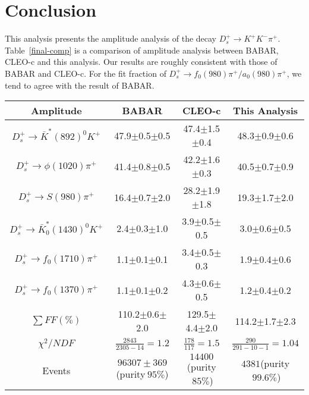 \documentclass[aps,prd,twocolumn,showpacs,amsmath,amssymb]{revtex4-1}
\begin{document}
\section{Conclusion}
\label{CONLUSION}
This analysis presents the amplitude analysis of the decay $D_{s}^{+} \rightarrow K^{+}K^{-}\pi^{+}$.
Table~\ref{final-comp} is a comparison of amplitude analysis between BABAR, CLEO-c and this analysis. Our results are roughly consistent with those of BABAR and CLEO-c.
For the fit fraction of $D_{s}^{+} \rightarrow f_{0}(980)\pi^{+}/a_{0}(980)\pi^{+}$, we tend to agree with the result of BABAR.
\begin{table*}[htbp]
    \caption{Comparison of fit fraction between BABAR, CLEO-c and this amplitude analysis.}
    \label{final-comp}
    \begin{center}
        \begin{tabular}{cccc}
            \hline\hline
            Amplitude & BABAR  & CLEO-c  & This Analysis\\
            \hline
            $D_{s}^{+} \rightarrow \bar{K}^{*}(892)^{0}K^{+}$              & 47.9$\pm$0.5$\pm$0.5  & 47.4$\pm$1.5$\pm$0.4& 48.3$\pm$0.9$\pm$0.6 \\
            $D_{s}^{+} \rightarrow \phi(1020)\pi^{+}$                      & 41.4$\pm$0.8$\pm$0.5  & 42.2$\pm$1.6$\pm$0.3& 40.5$\pm$0.7$\pm$0.9 \\
            $D_{s}^{+} \rightarrow S(980)\pi^{+}$    & 16.4$\pm$0.7$\pm$2.0  & 28.2$\pm$1.9$\pm$1.8& 19.3$\pm$1.7$\pm$2.0 \\
            $D_{s}^{+} \rightarrow \bar{K}^{*}_{0}(1430)^{0}K^{+}$         & 2.4$\pm$0.3$\pm$1.0   & 3.9$\pm$0.5$\pm$0.5 & 3.0$\pm$0.6$\pm$0.5  \\
            $D_{s}^{+} \rightarrow f_{0}(1710)\pi^{+}$                     & 1.1$\pm$0.1$\pm$0.1   & 3.4$\pm$0.5$\pm$0.3 & 1.9$\pm$0.4$\pm$0.6  \\
            $D_{s}^{+} \rightarrow f_{0}(1370)\pi^{+}$                     & 1.1$\pm$0.1$\pm$0.2   & 4.3$\pm$0.6$\pm$0.5 & 1.2$\pm$0.4$\pm$0.2  \\
            $\begin{matrix}\sum FF(\%)\end{matrix}$                          & 110.2$\pm$0.6$\pm$2.0 & 129.5$\pm$4.4$\pm$2.0 & 114.2$\pm$1.7$\pm$2.3\\
                $\chi^{2}/NDF$                                                  & $\frac{2843}{2305-14}=1.2$ & $\frac{178}{117}=1.5$ & $\frac{290}{291-10-1}=1.04$\\
            Events                                                         &$96307\pm369$(purity$\ 95\%$)          &$14400$(purity$\ 85\%$)  &$4381$(purity$\ 99.6\%$)\\
            \hline\hline
        \end{tabular}
    \end{center}
\end{table*}
\end{document}
